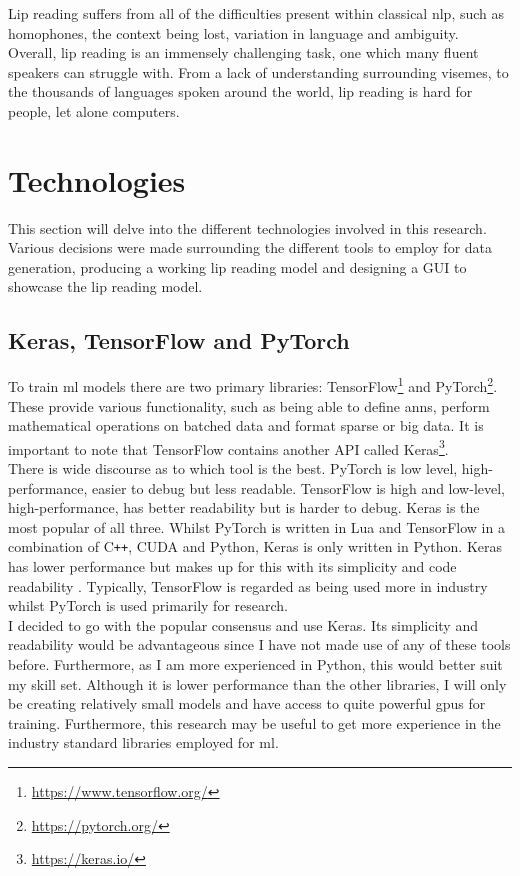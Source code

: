 Lip reading suffers from all of the difficulties present within classical \acrlong{nlp}, such as homophones, the context being lost, variation in language and ambiguity.\\
Overall, lip reading is an immensely challenging task, one which many fluent speakers can struggle with. From a lack of understanding surrounding \gls{viseme}s, to the thousands of languages spoken around the world, lip reading is hard for people, let alone computers.
\section{Technologies}
This section will delve into the different technologies involved in this research. Various decisions were made surrounding the different tools to employ for data generation, producing a working lip reading model and designing a GUI to showcase the lip reading model.
\subsection{Keras, TensorFlow and PyTorch}
To train \acrshort{ml} models there are two primary libraries: TensorFlow\footnote{\url{https://www.tensorflow.org/}} and PyTorch\footnote{\url{https://pytorch.org/}}. These provide various functionality, such as being able to define \acrlong{anns}, perform mathematical operations on batched data and format sparse or big data. It is important to note that TensorFlow contains another API called Keras\footnote{\url{https://keras.io/}}.\\
There is wide discourse as to which tool is the best. PyTorch is low level, high-performance, easier to debug but less readable. TensorFlow is high and low-level, high-performance, has better readability but is harder to debug. Keras is the most popular of all three. Whilst PyTorch is written in Lua and TensorFlow in a combination of C\texttt{++}, CUDA and Python, Keras is only written in Python. Keras has lower performance but makes up for this with its simplicity and code readability \cite{Keras-vs-TF-vs-PT}. Typically, TensorFlow is regarded as being used more in industry whilst PyTorch is used primarily for research.\\
I decided to go with the popular consensus and use Keras. Its simplicity and readability would be advantageous since I have not made use of any of these tools before. Furthermore, as I am more experienced in Python, this would better suit my skill set. Although it is lower performance than the other libraries, I will only be creating relatively small models and have access to quite powerful \acrshort{gpu}s for training. Furthermore, this research may be useful to get more experience in the industry standard libraries employed for \acrshort{ml}.
